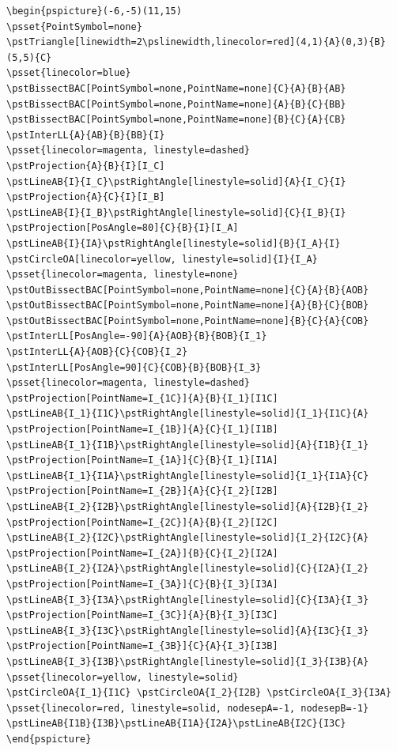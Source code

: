 \documentclass[11pt,english,BCOR=10mm,DIV=12,bibliography=totoc,parskip=false,headings=small,
    headinclude=false,footinclude=false,twoside,english]{pst-doc}
\begin{document}
\begin{lstlisting}
\begin{pspicture}(-6,-5)(11,15)
\psset{PointSymbol=none}
\pstTriangle[linewidth=2\pslinewidth,linecolor=red](4,1){A}(0,3){B}(5,5){C}
\psset{linecolor=blue}
\pstBissectBAC[PointSymbol=none,PointName=none]{C}{A}{B}{AB}
\pstBissectBAC[PointSymbol=none,PointName=none]{A}{B}{C}{BB}
\pstBissectBAC[PointSymbol=none,PointName=none]{B}{C}{A}{CB}
\pstInterLL{A}{AB}{B}{BB}{I}
\psset{linecolor=magenta, linestyle=dashed}
\pstProjection{A}{B}{I}[I_C]
\pstLineAB{I}{I_C}\pstRightAngle[linestyle=solid]{A}{I_C}{I}
\pstProjection{A}{C}{I}[I_B]
\pstLineAB{I}{I_B}\pstRightAngle[linestyle=solid]{C}{I_B}{I}
\pstProjection[PosAngle=80]{C}{B}{I}[I_A]
\pstLineAB{I}{IA}\pstRightAngle[linestyle=solid]{B}{I_A}{I}
\pstCircleOA[linecolor=yellow, linestyle=solid]{I}{I_A}
\psset{linecolor=magenta, linestyle=none}
\pstOutBissectBAC[PointSymbol=none,PointName=none]{C}{A}{B}{AOB}
\pstOutBissectBAC[PointSymbol=none,PointName=none]{A}{B}{C}{BOB}
\pstOutBissectBAC[PointSymbol=none,PointName=none]{B}{C}{A}{COB}
\pstInterLL[PosAngle=-90]{A}{AOB}{B}{BOB}{I_1}
\pstInterLL{A}{AOB}{C}{COB}{I_2}
\pstInterLL[PosAngle=90]{C}{COB}{B}{BOB}{I_3}
\psset{linecolor=magenta, linestyle=dashed}
\pstProjection[PointName=I_{1C}]{A}{B}{I_1}[I1C]
\pstLineAB{I_1}{I1C}\pstRightAngle[linestyle=solid]{I_1}{I1C}{A}
\pstProjection[PointName=I_{1B}]{A}{C}{I_1}[I1B]
\pstLineAB{I_1}{I1B}\pstRightAngle[linestyle=solid]{A}{I1B}{I_1}
\pstProjection[PointName=I_{1A}]{C}{B}{I_1}[I1A]
\pstLineAB{I_1}{I1A}\pstRightAngle[linestyle=solid]{I_1}{I1A}{C}
\pstProjection[PointName=I_{2B}]{A}{C}{I_2}[I2B]
\pstLineAB{I_2}{I2B}\pstRightAngle[linestyle=solid]{A}{I2B}{I_2}
\pstProjection[PointName=I_{2C}]{A}{B}{I_2}[I2C]
\pstLineAB{I_2}{I2C}\pstRightAngle[linestyle=solid]{I_2}{I2C}{A}
\pstProjection[PointName=I_{2A}]{B}{C}{I_2}[I2A]
\pstLineAB{I_2}{I2A}\pstRightAngle[linestyle=solid]{C}{I2A}{I_2}
\pstProjection[PointName=I_{3A}]{C}{B}{I_3}[I3A]
\pstLineAB{I_3}{I3A}\pstRightAngle[linestyle=solid]{C}{I3A}{I_3}
\pstProjection[PointName=I_{3C}]{A}{B}{I_3}[I3C]
\pstLineAB{I_3}{I3C}\pstRightAngle[linestyle=solid]{A}{I3C}{I_3}
\pstProjection[PointName=I_{3B}]{C}{A}{I_3}[I3B]
\pstLineAB{I_3}{I3B}\pstRightAngle[linestyle=solid]{I_3}{I3B}{A}
\psset{linecolor=yellow, linestyle=solid}
\pstCircleOA{I_1}{I1C} \pstCircleOA{I_2}{I2B} \pstCircleOA{I_3}{I3A}
\psset{linecolor=red, linestyle=solid, nodesepA=-1, nodesepB=-1}
\pstLineAB{I1B}{I3B}\pstLineAB{I1A}{I2A}\pstLineAB{I2C}{I3C}
\end{pspicture}
\end{lstlisting}
\end{document}

